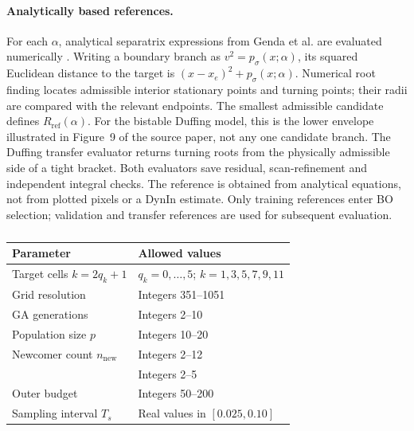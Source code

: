 \begin{bluerevision}
\paragraph{Analytically based references.}
For each $\alpha$, analytical separatrix expressions from Genda et al. are evaluated numerically \cite{ref13}. Writing a boundary branch as $v^2=p_\sigma(x;\alpha)$, its squared Euclidean distance to the target is $(x-x_e)^2+p_\sigma(x;\alpha)$. Numerical root finding locates admissible interior stationary points and turning points; their radii are compared with the relevant endpoints. The smallest admissible candidate defines $R_{\mathrm{ref}}(\alpha)$. For the bistable Duffing model, this is the lower envelope illustrated in Figure~9 of the source paper, not any one candidate branch. The Duffing transfer evaluator returns turning roots from the physically admissible side of a tight bracket. Both evaluators save residual, scan-refinement and independent integral checks. The reference is obtained from analytical equations, not from plotted pixels or a DynIn estimate. Only training references enter BO selection; validation and transfer references are used for subsequent evaluation.
\end{bluerevision}

\begin{table}[htbp]
\centering\small
\caption[Eight-variable search space for Experiment B]{}
\label{tab:b-search-space}
\begingroup{}
\begin{tabularx}{\linewidth}{@{}Y l@{}}
\toprule Parameter & Allowed values \\
\midrule
Target cells $k=2q_k+1$ & $q_k=0,\ldots,5$; $k=1,3,5,7,9,11$ \\
Grid resolution  & Integers 351--1051 \\
GA generations & Integers 2--10 \\
Population size $p$ & Integers 10--20 \\
Newcomer count $n_{\mathrm{new}}$ & Integers 2--12 \\
 & Integers 2--5 \\
Outer budget  & Integers 50--200 \\
Sampling interval $T_s$ & Real values in $[0.025,0.10]$ \\
\bottomrule
\end{tabularx}\endgroup
\end{table}

